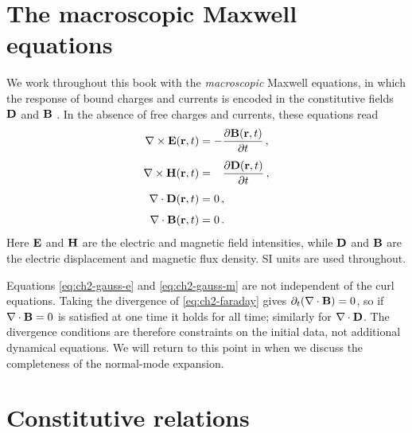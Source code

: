 
\section{The macroscopic Maxwell equations}
\label{sec:ch2-macroscopic-maxwell}

We work throughout this book with the \emph{macroscopic} Maxwell
equations, in which the response of bound charges and currents is
encoded in the constitutive fields $\mathbf{D}$ and $\mathbf{B}$
\cite{press2026photonic}.  In the
absence of free charges and currents, these equations read
\begin{subequations}\label{eq:ch2-maxwell-time}
\begin{align}
  \nabla\times\mathbf{E}(\mathbf{r},t) &= -\frac{\partial \mathbf{B}(\mathbf{r},t)}{\partial t}\,,
  \label{eq:ch2-faraday}\\[4pt]
  \nabla\times\mathbf{H}(\mathbf{r},t) &= \phantom{-}\frac{\partial \mathbf{D}(\mathbf{r},t)}{\partial t}\,,
  \label{eq:ch2-ampere}\\[4pt]
  \nabla\cdot\mathbf{D}(\mathbf{r},t)  &= 0\,,
  \label{eq:ch2-gauss-e}\\[4pt]
  \nabla\cdot\mathbf{B}(\mathbf{r},t)  &= 0\,.
  \label{eq:ch2-gauss-m}
\end{align}
\end{subequations}
Here $\mathbf{E}$ and $\mathbf{H}$ are the electric and magnetic field
intensities, while $\mathbf{D}$ and $\mathbf{B}$ are the electric
displacement and magnetic flux density.  SI units are used throughout.

\begin{remark}
Equations \eqref{eq:ch2-gauss-e} and \eqref{eq:ch2-gauss-m} are not
independent of the curl equations.  Taking the divergence of
\eqref{eq:ch2-faraday} gives $\partial_t(\nabla\cdot\mathbf{B})=0$, so if
$\nabla\cdot\mathbf{B}=0$ is satisfied at one time it holds for all time;
similarly for $\nabla\cdot\mathbf{D}$.  The divergence conditions are
therefore constraints on the initial data, not additional dynamical
equations.  We will return to this point in 
when we discuss the completeness of the normal-mode expansion.
\end{remark}

\section{Constitutive relations}
\label{sec:ch2-constitutive}

